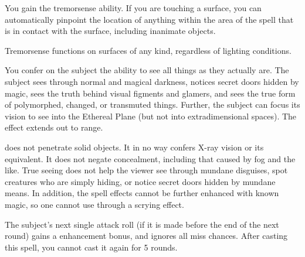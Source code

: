 \begin{spelleffect}
  You gain the tremorsense ability. If you are touching a surface, you can automatically pinpoint the location of anything within the area of the spell that is in contact with the surface, including inanimate objects.
\end{spelleffect}
\begin{spellnotes}
  Tremorsense functions on surfaces of any kind, regardless of lighting conditions.
\end{spellnotes}

\spelldur{\durshort}
\begin{spelleffect}
  You confer on the subject the ability to see all things as they actually are. The subject sees through normal and magical darkness, notices secret doors hidden by magic, sees the truth behind visual figments and glamers, and sees the true form of polymorphed, changed, or transmuted things. Further, the subject can focus its vision to see into the Ethereal Plane (but not into extradimensional spaces). The effect extends out to \rngmed range.
\end{spelleffect}
\begin{spellnotes}
   does not penetrate solid objects. It in no way confers X-ray vision or its equivalent. It does not negate concealment, including that caused by fog and the like. True seeing does not help the viewer see through mundane disguises, spot creatures who are simply hiding, or notice secret doors hidden by mundane means. In addition, the spell effects cannot be further enhanced with known magic, so one cannot use  through a scrying effect.
\end{spellnotes}

\spellrng{\rngmed}
\begin{spelleffect}
   The subject's next single attack roll (if it is made before the end of the next round) gains a  enhancement bonus, and ignores all miss chances. After casting this spell, you cannot cast it again for 5 rounds.
\end{spelleffect}

